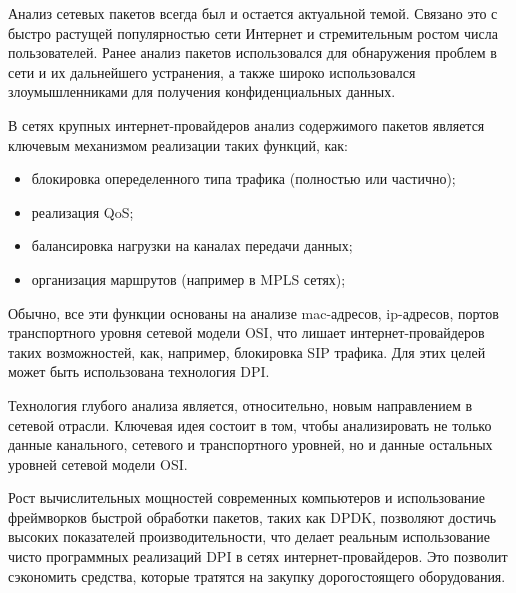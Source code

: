 \Introduction
Анализ сетевых пакетов всегда был и остается актуальной темой. Связано это с быстро растущей популярностью сети Интернет и стремительным ростом числа пользователей. Ранее анализ пакетов использовался для обнаружения проблем в сети и их дальнейшего устранения, а также широко использовался злоумышленниками для получения конфиденциальных данных.

В сетях крупных интернет-провайдеров анализ содержимого пакетов является ключевым механизмом реализации таких функций, как:
\begin{itemize}
\item блокировка опеределенного типа трафика (полностью или частично);
\item реализация QoS;
\item балансировка нагрузки на каналах передачи данных;
\item организация маршрутов (например в MPLS сетях);
\end{itemize}

Обычно, все эти функции основаны на анализе mac-адресов, ip-адресов, портов транспортного уровня сетевой модели OSI, что лишает интернет-провайдеров таких возможностей, как, например, блокировка SIP трафика. Для этих целей может быть использована технология DPI.

Технология глубого анализа является, относительно, новым направлением в сетевой отрасли. Ключевая идея состоит в том, чтобы анализировать не только данные канального, сетевого и транспортного уровней, но и данные остальных уровней сетевой модели OSI.

Рост вычислительных мощностей современных компьютеров и использование фреймворков быстрой обработки пакетов, таких как DPDK, позволяют достичь высоких показателей производительности, что делает реальным использование чисто программных реализаций DPI в сетях интернет-провайдеров. Это позволит сэкономить средства, которые тратятся на закупку дорогостоящего оборудования.
